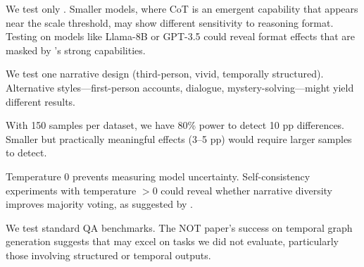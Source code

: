  We test only \gptfour. Smaller models, where CoT is an emergent capability that appears near the scale threshold, may show different sensitivity to reasoning format. Testing on models like Llama-8B or GPT-3.5 could reveal format effects that are masked by \gptfour's strong capabilities.

 We test one narrative design (third-person, vivid, temporally structured). Alternative styles---first-person accounts, dialogue, mystery-solving---might yield different results.

 With 150 samples per dataset, we have 80\% power to detect 10 pp differences. Smaller but practically meaningful effects (3--5 pp) would require larger samples to detect.

 Temperature 0 prevents measuring model uncertainty. Self-consistency experiments with temperature $> 0$ could reveal whether narrative diversity improves majority voting, as suggested by \citet{wang2023selfconsistency}.

 We test standard QA benchmarks. The NOT paper's success on temporal graph generation suggests that \storycot may excel on tasks we did not evaluate, particularly those involving structured or temporal outputs.
